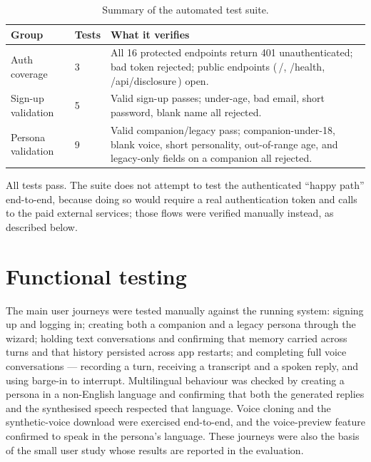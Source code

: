 \documentclass[11pt,a4paper]{report}
\begin{document}
\begin{table}[htbp]
\centering
\caption{Summary of the automated test suite.}
\label{tab:tests}
\small
\begin{tabularx}{\linewidth}{@{}l l X@{}}
\toprule
\textbf{Group} & \textbf{Tests} & \textbf{What it verifies} \\
\midrule
Auth coverage & 3 & All 16 protected endpoints return 401 unauthenticated; bad token rejected; public endpoints (\,/, /health, /api/disclosure\,) open. \\
Sign-up validation & 5 & Valid sign-up passes; under-age, bad email, short password, blank name all rejected. \\
Persona validation & 9 & Valid companion/legacy pass; companion-under-18, blank voice, short personality, out-of-range age, and legacy-only fields on a companion all rejected. \\
\bottomrule
\end{tabularx}
\end{table}

All tests pass. The suite does not attempt to test the authenticated ``happy path'' end-to-end, because doing so would require a real authentication token and calls to the paid external services; those flows were verified manually instead, as described below.

\section{Functional testing}
The main user journeys were tested manually against the running system: signing up and logging in; creating both a companion and a legacy persona through the wizard; holding text conversations and confirming that memory carried across turns and that history persisted across app restarts; and completing full voice conversations --- recording a turn, receiving a transcript and a spoken reply, and using barge-in to interrupt. Multilingual behaviour was checked by creating a persona in a non-English language and confirming that both the generated replies and the synthesised speech respected that language. Voice cloning and the synthetic-voice download were exercised end-to-end, and the voice-preview feature confirmed to speak in the persona's language. These journeys were also the basis of the small user study whose results are reported in the evaluation.
\end{document}
